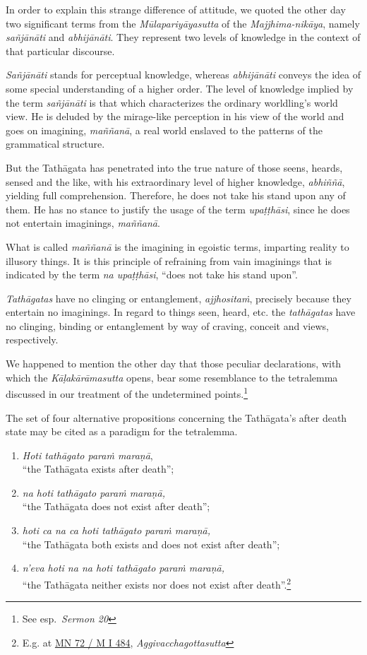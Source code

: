 In order to explain this strange difference of attitude, we quoted the other day two significant terms from the \emph{Mūlapariyāyasutta} of the \emph{Majjhima-nikāya}, namely \emph{sañjānāti} and \emph{abhijānāti}. They represent two levels of knowledge in the context of that particular discourse.

\emph{Sañjānāti} stands for perceptual knowledge, whereas \emph{abhijānāti} conveys the idea of some special understanding of a higher order. The level of knowledge implied by the term \emph{sañjānāti} is that which characterizes the ordinary worldling's world view. He is deluded by the mirage-like perception in his view of the world and goes on imagining, \emph{maññanā}, a real world enslaved to the patterns of the grammatical structure.

But the Tathāgata has penetrated into the true nature of those seens, heards, sensed and the like, with his extraordinary level of higher knowledge, \emph{abhiññā}, yielding full comprehension. Therefore, he does not take his stand upon any of them. He has no stance to justify the usage of the term \emph{upaṭṭhāsi}, since he does not entertain imaginings, \emph{maññanā}.

What is called \emph{maññanā} is the imagining in egoistic terms, imparting reality to illusory things. It is this principle of refraining from vain imaginings that is indicated by the term \emph{na upaṭṭhāsi}, ``does not take his stand upon''.

\emph{Tathāgatas} have no clinging or entanglement, \emph{ajjhositaṁ}, precisely because they entertain no imaginings. In regard to things seen, heard, etc. the \emph{tathāgatas} have no clinging, binding or entanglement by way of craving, conceit and views, respectively.

We happened to mention the other day that those peculiar declarations, with which the \emph{Kāḷakārāmasutta} opens, bear some resemblance to the tetralemma discussed in our treatment of the undetermined points.\footnote{See esp.~\emph{Sermon 20}}

The set of four alternative propositions concerning the Tathāgata's after death state may be cited as a paradigm for the tetralemma.

\begin{enumerate}
\def\labelenumi{\arabic{enumi}.}
\tightlist
\item
  \emph{Hoti tathāgato paraṁ maraṇā},\\
  ``the Tathāgata exists after death'';
\item
  \emph{na hoti tathāgato paraṁ maraṇā,}\\
  ``the Tathāgata does not exist after death'';
\item
  \emph{hoti ca na ca hoti tathāgato paraṁ maraṇā,}\\
  ``the Tathāgata both exists and does not exist after death'';
\item
  \emph{n'eva hoti na na hoti tathāgato paraṁ maraṇā,}\\
  ``the Tathāgata neither exists nor does not exist after death''.\footnote{E.g. at \href{https://suttacentral.net/mn72/pli/ms}{MN 72 / M I 484}, \emph{Aggivacchagottasutta}}
\end{enumerate}

